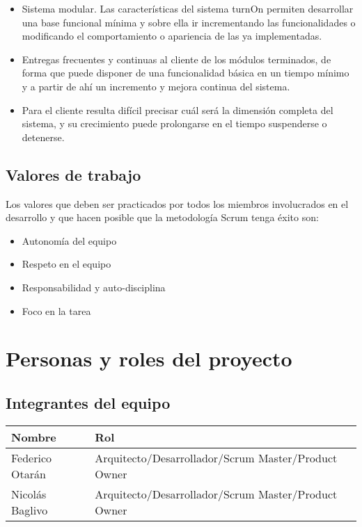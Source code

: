 \documentclass[a4paper,oneside,10pt]{article}
\begin{document}
\begin{itemize}

\item Sistema modular. Las características del sistema turnOn permiten desarrollar una base funcional mínima y sobre ella ir incrementando las funcionalidades o modificando el comportamiento o apariencia de las ya implementadas.                   

\item Entregas frecuentes y continuas al cliente de los módulos terminados, de forma que puede disponer de una funcionalidad básica en un tiempo mínimo y a partir de ahí un     incremento y mejora continua del sistema.

\item Para el cliente resulta difícil precisar cuál será la dimensión completa del sistema, y su crecimiento puede prolongarse en el tiempo suspenderse o detenerse.

\end{itemize}

\subsection{Valores de trabajo}
Los valores que deben ser practicados por todos los miembros involucrados en el desarrollo y que hacen posible que la metodología Scrum tenga éxito son:
\begin{itemize}
\item Autonomía del equipo
\item Respeto en el equipo
\item Responsabilidad y auto-disciplina
\item Foco en la tarea
\end{itemize}

\section{Personas y roles del proyecto}


\subsection{Integrantes del equipo}
\begin{tabular}{|l|l|}
\hline
Nombre&Rol\\
\hline
Federico Otar\'an & Arquitecto/Desarrollador/Scrum Master/Product Owner\\
Nicol\'as Baglivo & Arquitecto/Desarrollador/Scrum Master/Product Owner\\
\hline
\end{tabular}
\end{document}
